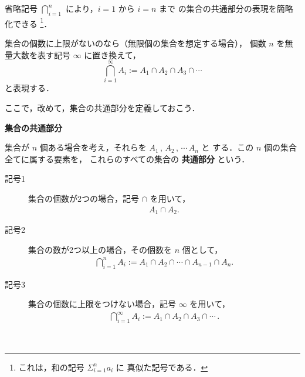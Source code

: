                     省略記号 $\bigcap_{i=1}^{n}$ により，$i=1$ から $i=n$ まで
                    の集合の共通部分の表現を簡略化できる
                        \footnote{
                                これは，和の記号 $\displaystyle\Sigma_{i=1}^{n}a_{i}$ に
                                真似た記号である．
                        }．

                    集合の個数に上限がないのなら（無限個の集合を想定する場合），
                    個数 $n$ を無量大数を表す記号 $\infty$ に置き換えて，
                        \begin{equation*}
                            \bigcap_{i=1}^{\infty} A_{i}
                                :=  A_{1} \cap A_{2} \cap  A_{3} \cap \cdots
                        \end{equation*}
                    と表現する．

                    ここで，改めて，集合の共通部分を定義しておこう．
                    \\
                    \begin{itembox}[l]{\textbf{集合の共通部分}}
                        \begin{dfn}
                            集合が $n$ 個ある場合を考え，それらを $A_{1}\,,\,A_{2}\,,\,\cdots\,A_{n}$ と
                            する．この $n$ 個の集合全てに属する要素を，
                            これらのすべての集合の \textbf{共通部分} という．
                            \begin{description}
                                \item[記号1] 集合の個数が2つの場合，記号 $\cap$ を用いて，
                                        \begin{align}
                                                A_{1} \cap A_{2}.
                                        \end{align}
                                \item[記号2] 集合の数が2つ以上の場合，その個数を $n$ 個として，
                                        \begin{align}
                                            \bigcap_{i=1}^{n} A_{i}
                                                :=  A_{1} \cap A_{2} \cap \cdots \cap A_{n-1} \cap A_{n}.
                                        \end{align}
                                \item[記号3] 集合の個数に上限をつけない場合，記号 $\infty$ を用いて，
                                        \begin{align}
                                            \bigcap_{i=1}^{\infty} A_{i}
                                                :=  A_{1} \cap A_{2} \cap  A_{3} \cap \cdots\,.
                                        \end{align}
                            \end{description}
                        \end{dfn}
                    \end{itembox}
                    \\

